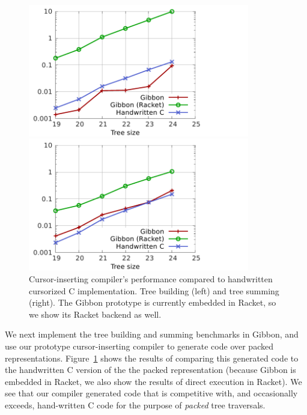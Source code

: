 \documentclass[a4paper,english]{lipics-v2016}
\newcommand{\treelang}{Gibbon\xspace} %
\begin{document}
\begin{figure}[t]
\hspace{-6mm}  
\begin{minipage}{1.00\textwidth}
  \begin{minipage}{.49\textwidth}
    \centering
    \includegraphics[width=3.8in]{./figs/shootout_gibbon_buildtree.pdf}
  \end{minipage}
  \hspace{0.03\textwidth}
  \begin{minipage}{.49\textwidth}
    \centering
    \includegraphics[width=3.8in]{./figs/shootout_gibbon_sumtree.pdf}
  \end{minipage}
\end{minipage}
   \caption{Cursor-inserting compiler's performance compared to handwritten
     cursorized C implementation.  Tree building (left) and tree summing
     (right). The Gibbon prototype is currently embedded in Racket, so we show
     its Racket backend as well.}
   \label{fig:shootout2}
\end{figure}


We next implement the tree building and summing benchmarks in \treelang{}, and
use our prototype cursor-inserting compiler to generate code over packed
representations.
% 
Figure~\ref{fig:shootout2} shows the results of comparing this
generated code to the handwritten C version of the the packed representation
(because \treelang{} is embedded in Racket, we also show the results of direct
execution in Racket).
%
{We see that our compiler generated code that is competitive with, and
  occasionally exceeds, hand-written C code for the purpose of {\em packed} tree
  traversals.}
\end{document}

